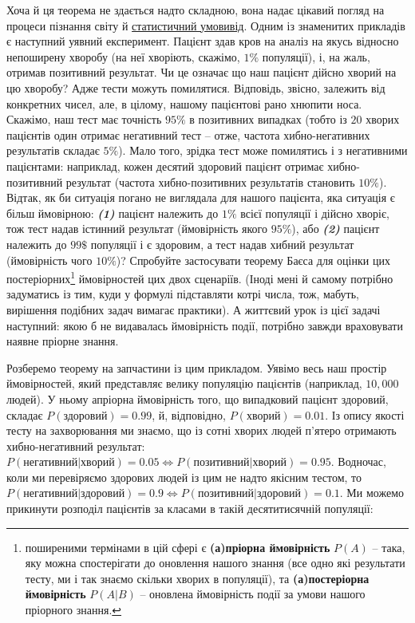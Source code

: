\documentclass[
  11pt,
]{book}
\begin{document}
Хоча й ця теорема не здається надто складною, вона надає цікавий погляд на процеси пізнання світу й \hyperref[paradigms]{статистичний умовивід}. Одним із знаменитих прикладів є наступний уявний експеримент. Пацієнт здав кров на аналіз на якусь відносно непоширену хворобу (на неї хворіють, скажімо, \(1\%\) популяції), і, на жаль, отримав позитивний результат. Чи це означає що наш пацієнт дійсно хворий на цю хворобу? Адже тести можуть помилятися. Відповідь, звісно, залежить від конкретних чисел, але, в цілому, нашому пацієнтові рано хнюпити носа. Скажімо, наш тест має точність \(95\%\) в позитивних випадках (тобто із \(20\) хворих пацієнтів один отримає негативний тест -- отже, частота хибно-негативних результатів складає \(5\%\)). Мало того, зрідка тест може помилятись і з негативними пацієнтами: наприклад, кожен десятий здоровий пацієнт отримає хибно-позитивний результат (частота хибно-позитивних результатів становить \(10\%\)). Відтак, як би ситуація погано не виглядала для нашого пацієнта, яка ситуація є більш ймовірною: \textbf{\emph{(1)}} пацієнт належить до \(1\%\) всієї популяції і дійсно хворіє, тож тест надав істинний результат (ймовірність якого \(95\%\)), або \textbf{\emph{(2)}} пацієнт належить до \(99\$%
\) популяції і є здоровим, а тест надав хибний результат (ймовірність чого \(10\%\))? Спробуйте застосувати теорему Баєса для оцінки цих постеріорних\footnote{поширеними термінами в цій сфері є \textbf{(а)пріорна ймовірність} \(P(A)\) -- така, яку можна спостерігати до оновлення нашого знання (все одно які результати тесту, ми і так знаємо скільки хворих в популяції), та \textbf{(а)постеріорна ймовірність} \(P(A|B)\) -- оновлена ймовірність події за умови нашого пріорного знання.} ймовірностей цих двох сценаріїв. (Іноді мені й самому потрібно задуматись із тим, куди у формулі підставляти котрі числа, тож, мабуть, вирішення подібних задач вимагає практики). А життєвий урок із цієї задачі наступний: якою б не видавалась ймовірність події, потрібно завжди враховувати наявне пріорне знання.

Розберемо теорему на запчастини із цим прикладом. Уявімо весь наш простір ймовірностей, який представляє велику популяцію пацієнтів (наприклад, \(10,000\) людей). У ньому апріорна ймовірність того, що випадковий пацієнт здоровий, складає \(P(\text{здоровий}) = 0.99\), й, відповідно, \(P(\text{хворий}) = 0.01\). Із опису якості тесту на захворювання ми знаємо, що із сотні хворих людей п'ятеро отримають хибно-негативний результат: \(P(\text{негативний|хворий}) = 0.05 \Leftrightarrow P(\text{позитивний|хворий}) = 0.95\). Водночас, коли ми перевіряємо здорових людей із цим не надто якісним тестом, то \(P(\text{негативний|здоровий}) = 0.9 \Leftrightarrow P(\text{позитивний|здоровий}) = 0.1\). Ми можемо прикинути розподіл пацієнтів за класами в такій десятитисячній популяції:
\end{document}
